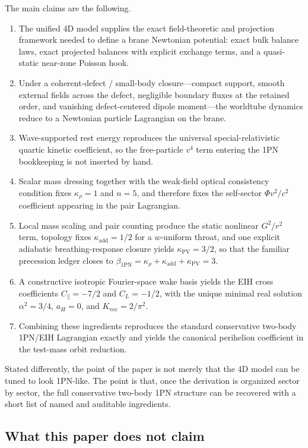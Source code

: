 \documentclass[11pt]{article}
\newcommand{\kadd}{\kappa_{\mathrm{add}}}
\newcommand{\kPV}{\kappa_{\mathrm{PV}}}
\newcommand{\krho}{\kappa_{\rho}}
\newcommand{\betaPN}{\beta_{\mathrm{1PN}}}
\newcommand{\Kvec}{K_{\mathrm{vec}}}
\newcommand{\alphaSq}{\alpha^2}
\newcommand{\Cpara}{C_{\parallel}}
\newcommand{\CLong}{C_{L}}
\begin{document}
The main claims are the following.
\begin{enumerate}[leftmargin=1.5em]
  \item The unified 4D model supplies the exact field-theoretic and projection framework needed to define a brane Newtonian potential: exact bulk balance laws, exact projected balances with explicit exchange terms, and a quasi-static near-zone Poisson hook.
  \item Under a coherent-defect / small-body closure---compact support, smooth external fields across the defect, negligible boundary fluxes at the retained order, and vanishing defect-centered dipole moment---the worldtube dynamics reduce to a Newtonian particle Lagrangian on the brane.
  \item Wave-supported rest energy reproduces the universal special-relativistic quartic kinetic coefficient, so the free-particle \(v^4\) term entering the 1PN bookkeeping is not inserted by hand.
  \item Scalar mass dressing together with the weak-field optical consistency condition fixes \(\krho=1\) and \(n=5\), and therefore fixes the self-sector \(\Phi v^2/c^2\) coefficient appearing in the pair Lagrangian.
  \item Local mass scaling and pair counting produce the static nonlinear \(G^2/r^2\) term, topology fixes \(\kadd=1/2\) for a \(w\)-uniform throat, and one explicit adiabatic breathing-response closure yields \(\kPV=3/2\), so that the familiar precession ledger closes to \(\betaPN=\krho+\kadd+\kPV=3\).
  \item A constructive isotropic Fourier-space wake basis yields the EIH cross coefficients \(\Cpara=-7/2\) and \(\CLong=-1/2\), with the unique minimal real solution \(\alphaSq=3/4\), \(a_H=0\), and \(\Kvec=2/\pi^2\).
  \item Combining these ingredients reproduces the standard conservative two-body 1PN/EIH Lagrangian exactly and yields the canonical perihelion coefficient in the test-mass orbit reduction.
\end{enumerate}

Stated differently, the point of the paper is not merely that the 4D model can be tuned to look 1PN-like. The point is that, once the derivation is organized sector by sector, the full conservative two-body 1PN structure can be recovered with a short list of named and auditable ingredients.

\subsection{What this paper does not claim}
\label{sec:nonclaims}
\end{document}

